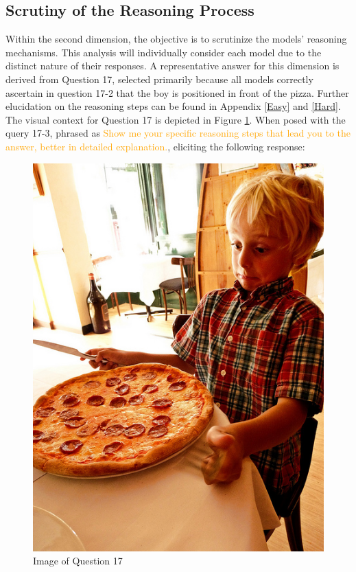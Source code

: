 \documentclass[journal,10pt]{IEEEtran}
\begin{document}
\subsection{Scrutiny of the Reasoning Process}

Within the second dimension, the objective is to scrutinize the models' reasoning mechanisms. This analysis will individually consider each model due to the distinct nature of their responses. A representative answer for this dimension is derived from Question 17, selected primarily because all models correctly ascertain in question 17-2 that the boy is positioned in front of the pizza. Further elucidation on the reasoning steps can be found in Appendix \ref{Easy} and \ref{Hard}. The visual context for Question 17 is depicted in Figure \ref{fig:reasoning-process}. When posed with the query 17-3, phrased as \textcolor{orange}{Show me your specific reasoning steps that lead you to the answer, better in detailed explanation.}, eliciting the following response:

\begin{figure}[h]
    \centering
    \includegraphics[width=0.6\linewidth]{../image set/easy/000000089367.jpg}
    \caption{Image of Question 17}
    \label{fig:reasoning-process}
\end{figure}
\end{document}
